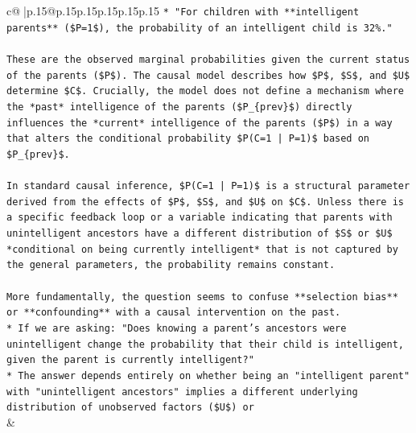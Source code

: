 \documentclass{article}
\begin{document}
{\begin{supertabular}{c@{$\;$}|p{.15\linewidth}@{}p{.15\linewidth}p{.15\linewidth}p{.15\linewidth}p{.15\linewidth}p{.15\linewidth}}
{{{\texttt{*   "For children with **intelligent parents** (\$P=1\$), the probability of an intelligent child is 32\%."} \\
\\ 
\texttt{These are the observed marginal probabilities given the current status of the parents (\$P\$). The causal model describes how \$P\$, \$S\$, and \$U\$ determine \$C\$. Crucially, the model does not define a mechanism where the *past* intelligence of the parents (\$P\_\{prev\}\$) directly influences the *current* intelligence of the parents (\$P\$) in a way that alters the conditional probability \$P(C=1 | P=1)\$ based on \$P\_\{prev\}\$.} \\
\\ 
\texttt{In standard causal inference, \$P(C=1 | P=1)\$ is a structural parameter derived from the effects of \$P\$, \$S\$, and \$U\$ on \$C\$. Unless there is a specific feedback loop or a variable indicating that parents with unintelligent ancestors have a different distribution of \$S\$ or \$U\$ *conditional on being currently intelligent* that is not captured by the general parameters, the probability remains constant.} \\
\\ 
\texttt{More fundamentally, the question seems to confuse **selection bias** or **confounding** with a causal intervention on the past.} \\
\texttt{*   If we are asking: "Does knowing a parent's ancestors were unintelligent change the probability that their child is intelligent, given the parent is currently intelligent?"} \\
\texttt{*   The answer depends entirely on whether being an "intelligent parent" with "unintelligent ancestors" implies a different underlying distribution of unobserved factors (\$U\$) or} \\
            }
        }
    }
    & \\ \\


\end{supertabular}}
\end{document}
